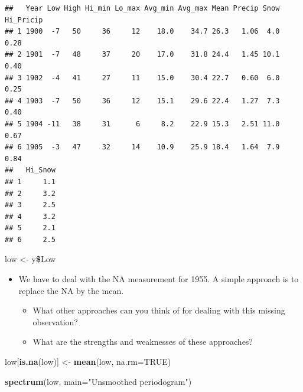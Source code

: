 \documentclass[]{article}
\newenvironment{Shaded}{\begin{snugshade}}{\end{snugshade}}
\newcommand{\KeywordTok}[1]{\textcolor[rgb]{0.13,0.29,0.53}{\textbf{#1}}}
\newcommand{\DataTypeTok}[1]{\textcolor[rgb]{0.13,0.29,0.53}{#1}}
\newcommand{\StringTok}[1]{\textcolor[rgb]{0.31,0.60,0.02}{#1}}
\newcommand{\OtherTok}[1]{\textcolor[rgb]{0.56,0.35,0.01}{#1}}
\newcommand{\OperatorTok}[1]{\textcolor[rgb]{0.81,0.36,0.00}{\textbf{#1}}}
\newcommand{\NormalTok}[1]{#1}
\begin{document}
\begin{verbatim}
##   Year Low High Hi_min Lo_max Avg_min Avg_max Mean Precip Snow Hi_Pricip
## 1 1900  -7   50     36     12    18.0    34.7 26.3   1.06  4.0      0.28
## 2 1901  -7   48     37     20    17.0    31.8 24.4   1.45 10.1      0.40
## 3 1902  -4   41     27     11    15.0    30.4 22.7   0.60  6.0      0.25
## 4 1903  -7   50     36     12    15.1    29.6 22.4   1.27  7.3      0.40
## 5 1904 -11   38     31      6     8.2    22.9 15.3   2.51 11.0      0.67
## 6 1905  -3   47     32     14    10.9    25.9 18.4   1.64  7.9      0.84
##   Hi_Snow
## 1     1.1
## 2     3.2
## 3     2.5
## 4     3.2
## 5     2.1
## 6     2.5
\end{verbatim}

\begin{Shaded}
\begin{Highlighting}[]
\NormalTok{low <-}\StringTok{ }\NormalTok{y}\OperatorTok{\$}\NormalTok{Low}
\end{Highlighting}
\end{Shaded}

\begin{itemize}
\item
  We have to deal with the NA measurement for 1955. A simple approach is
  to replace the NA by the mean.

  \begin{itemize}
  \item
    What other approaches can you think of for dealing with this missing
    observation?
  \item
    What are the strengths and weaknesses of these approaches?
  \end{itemize}
\end{itemize}

\begin{Shaded}
\begin{Highlighting}[]
\NormalTok{low[}\KeywordTok{is.na}\NormalTok{(low)] <-}\StringTok{ }\KeywordTok{mean}\NormalTok{(low, }\DataTypeTok{na.rm=}\OtherTok{TRUE}\NormalTok{)}
\end{Highlighting}
\end{Shaded}

\begin{Shaded}
\begin{Highlighting}[]
\KeywordTok{spectrum}\NormalTok{(low, }\DataTypeTok{main=}\StringTok{"Unsmoothed periodogram"}\NormalTok{)}
\end{Highlighting}
\end{Shaded}
\end{document}
